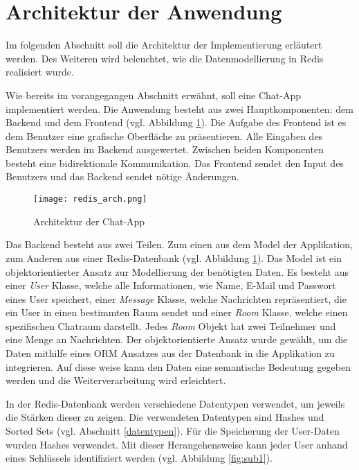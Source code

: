 
\section{Architektur der Anwendung}
Im folgenden Abschnitt soll die Architektur der Implementierung erläutert werden. Des Weiteren wird beleuchtet, wie die Datenmodellierung in \acs{Redis} realisiert wurde.

Wie bereits im vorangegangen Abschnitt erwähnt, soll eine Chat-App implementiert werden. Die Anwendung besteht aus zwei Hauptkomponenten: dem Backend und dem Frontend (vgl. Abbildung \ref{fig:arch}). Die Aufgabe des Frontend ist es dem Benutzer eine grafische Oberfläche zu präsentieren. Alle Eingaben des Benutzers werden im Backend ausgewertet. Zwischen beiden Komponenten besteht eine bidirektionale Kommunikation. Das Frontend sendet den Input des Benutzers und das Backend sendet nötige Änderungen.
\begin{figure}[h]
	\centering
	\texttt{[image: redis\_arch.png]}
	\caption{Architektur der Chat-App}
	\label{fig:arch}
\end{figure}

Das Backend besteht aus zwei Teilen. Zum einen aus dem Model der Applikation, zum Anderen aus einer \acs{Redis}-Datenbank (vgl. Abbildung \ref{fig:arch}). Das Model ist ein objektorientierter Ansatz zur Modellierung der benötigten Daten. Es besteht aus einer \textit{User} Klasse, welche alle Informationen, wie Name, E-Mail und Passwort eines User speichert, einer \textit{Message} Klasse, welche Nachrichten repräsentiert, die ein User in einen bestimmten Raum sendet und einer \textit{Room} Klasse, welche einen spezifischen Chatraum darstellt. Jedes \textit{Room} Objekt hat zwei Teilnehmer und eine Menge an Nachrichten. Der objektorientierte Ansatz wurde gewählt, um die Daten mithilfe eines \acs{ORM} Ansatzes aus der Datenbank in die Applikation zu integrieren. Auf diese weise kann den Daten eine semantische Bedeutung gegeben werden und die Weiterverarbeitung wird erleichtert.

In der \acs{Redis}-Datenbank werden verschiedene Datentypen verwendet, um jeweils die Stärken dieser zu zeigen. Die verwendeten Datentypen sind Hashes und Sorted Sets (vgl. Abschnitt \ref{datentypen}). Für die Speicherung der User-Daten wurden Hashes verwendet. Mit dieser Herangehensweise kann jeder User anhand eines Schlüssels identifiziert werden (vgl. Abbildung \ref{fig:sub1}).

